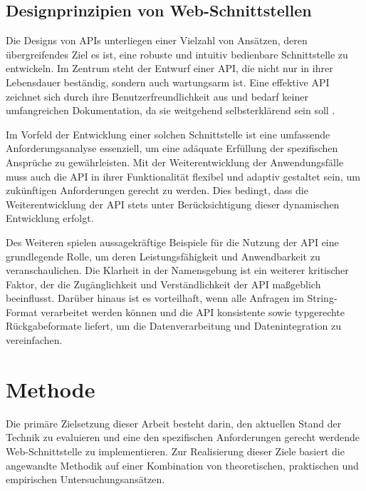 \documentclass[draft,final]{vutinfth} %
\begin{document}
\section{Designprinzipien von Web-Schnittstellen}

Die Designs von APIs unterliegen einer Vielzahl von Ansätzen, deren übergreifendes Ziel es ist, eine robuste und intuitiv bedienbare Schnittstelle zu entwickeln. 
Im Zentrum steht der Entwurf einer API, die nicht nur in ihrer Lebensdauer beständig, sondern auch wartungsarm ist. 
Eine effektive API zeichnet sich durch ihre Benutzerfreundlichkeit aus und bedarf keiner umfangreichen Dokumentation, da sie weitgehend selbsterklärend sein soll \cite{Bloch:2006:How2DesignGoodAPI}.

Im Vorfeld der Entwicklung einer solchen Schnittstelle ist eine umfassende Anforderungsanalyse essenziell, um eine adäquate Erfüllung der spezifischen Ansprüche zu gewährleisten. 
Mit der Weiterentwicklung der Anwendungsfälle muss auch die API in ihrer Funktionalität flexibel und adaptiv gestaltet sein, um zukünftigen Anforderungen gerecht zu werden. 
Dies bedingt, dass die Weiterentwicklung der API stets unter Berücksichtigung dieser dynamischen Entwicklung erfolgt. \cite{Bloch:2006:How2DesignGoodAPI}

Des Weiteren spielen aussagekräftige Beispiele für die Nutzung der API eine grundlegende Rolle, um deren Leistungsfähigkeit und Anwendbarkeit zu veranschaulichen. 
Die Klarheit in der Namensgebung ist ein weiterer kritischer Faktor, der die Zugänglichkeit und Verständlichkeit der API maßgeblich beeinflusst. 
Darüber hinaus ist es vorteilhaft, wenn alle Anfragen im String-Format verarbeitet werden können und die API konsistente sowie typgerechte Rückgabeformate liefert, um die Datenverarbeitung und Datenintegration zu vereinfachen. \cite{Bloch:2006:How2DesignGoodAPI}









\chapter{Methode}

Die primäre Zielsetzung dieser Arbeit besteht darin, den aktuellen Stand der Technik zu evaluieren und eine den spezifischen Anforderungen gerecht werdende Web-Schnittstelle zu implementieren. 
Zur Realisierung dieser Ziele basiert die angewandte Methodik auf einer Kombination von theoretischen, praktischen und empirischen Untersuchungsansätzen.
\end{document}
